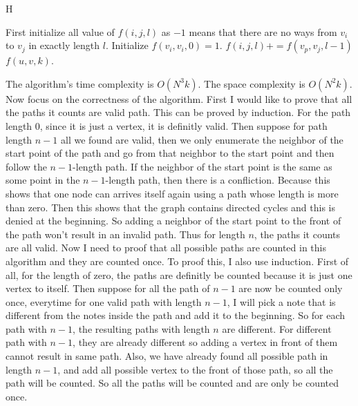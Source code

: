 \documentclass{article}
\begin{document}
\begin{enumerate}
\begin{algorithm}{H}
\begin{algorithmic}[1]
					\State First initialize all value of $f(i, j, l)$ as $-1$ means that there are no ways from $v_i$ to $v_j$ in exactly length $l$. 
					\State {}
						\State Initialize $f(v_i, v_i, 0) = 1$.
					\EndFor
					\State {}
						\State \For {$v_i \in S$}
							\State \For {$v_j \in S$}
								\State {}
									\State \If {$f(v_p, v_j, l - 1) != -1$}
										\State $f(i, j, l) += f(v_p, v_j, l - 1)$
									\EndIf
								\EndFor
							\EndFor
						\EndFor
					\EndFor
					\State \Return $f(u, v, k)$.
				\end{algorithmic}
			\end{algorithm}
			The algorithm's time complexity is $O(N^3k)$. The space complexity is $O(N^2k)$. \newline
			Now focus on the correctness of the algorithm. First I would like to prove that all the paths it counts are valid path. This can be proved by induction. For the path length $0$, since it is just a vertex, it is definitly valid. Then suppose for path length $n - 1$ all we found are valid, then we only enumerate the neighbor of the start point of the path and go from that neighbor to the start point and then follow the $n - 1$-length path. If the neighbor of the start point is the same as some point in the $n - 1$-length path, then there is a confliction. Because this shows that one node can arrives itself again using a path whose length is more than zero. Then this shows that the graph contains directed cycles and this is denied at the beginning. So adding a neighbor of the start point to the front of the path won't result in an invalid path. Thus for length $n$, the paths it counts are all valid.\newline
			Now I need to proof that all possible paths are counted in this algorithm and they are counted once. To proof this, I also use induction. First of all, for the length of zero, the paths are definitly be counted because it is just one vertex to itself. Then suppose for all the path of $n - 1$ are now be counted only once, everytime for one valid path with length $n - 1$, I will pick a note that is different from the notes inside the path and add it to the beginning. So for each path with $n - 1$, the resulting paths with length $n$ are different. For different path with $n - 1$, they are already different so adding a vertex in front of them cannot result in same path. Also, we have already found all possible path in length $n - 1$, and add all possible vertex to the front of those path, so all the path will be counted. So all the paths will be counted and are only be counted once.

\end{enumerate}
\end{document}
